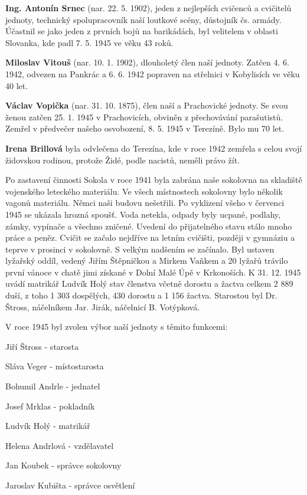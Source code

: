 \textbf{Ing. Antonín Srnec} (nar. 22. 5. 1902), jeden z nejlepších
cvičenců a cvičitelů jednoty, technický spolupracovník naší loutkové
scény, důstojník čs. armády. Účastnil se jako jeden z prvních bojů na
barikádách, byl velitelem v oblasti Slovanka, kde padl 7. 5. 1945 ve
věku 43 roků.

\textbf{Miloslav Vitouš} (nar. 10. 1. 1902), dlouholetý člen naší
jednoty. Zatčen 4. 6. 1942, odvezen na Pankrác a 6. 6. 1942 popraven na
střelnici v Kobylisích ve věku 40 let.

\textbf{Václav Vopička} (nar. 31. 10. 1875), člen naší a Prachovické
jednoty. Se svou ženou zatčen 25. 1. 1945 v Prachovicích, obviněn z
přechovávání parašutistů. Zemřel v předvečer našeho osvobození, 8. 5.
1945 v Terezíně. Bylo mu 70 let.

\textbf{Irena Brillová} byla odvlečena do Terezína, kde v roce 1942
zemřela s celou svojí židovskou rodinou, protože Židé, podle nacistů,
neměli právo žít.

Po zastavení činnosti Sokola v roce 1941 byla zabrána naše sokolovna na
skladiště vojenského leteckého materiálu. Ve všech místnostech sokolovny
bylo několik vagonů materiálu. Němci naši budovu nešetřili. Po vyklizení
všeho v červenci 1945 se ukázala hrozná spoušť. Voda netekla, odpady
byly ucpané, podlahy, zámky, vypínače a všechno zničené. Uvedení do
přijatelného stavu stálo mnoho práce a peněz. Cvičit se začalo nejdříve
na letním cvičišti, později v gymnáziu a teprve v prosinci v sokolovně.
S velkým nadšením se začínalo. Byl ustaven lyžařský oddíl, vedený Jiřím
Štěpničkou a Mirkem Vaňkem a 20 lyžařů trávilo první vánoce v chatě jimi
získané v Dolní Malé Úpě v Krkonoších. K 31. 12. 1945 uvádí matrikář
Ludvík Holý stav členstva včetně dorostu a žactva celkem 2 889 duší, z
toho 1 303 dospělých, 430 dorostu a 1 156 žactva. Starostou byl Dr.
Štross, náčelníkem Jar. Jirák, náčelnicí B. Votýpková.

V roce 1945 byl zvolen výbor naší jednoty s těmito funkcemi:

Jiří Štross - starosta

Sláva Veger - místostarosta

Bohumil Andrle - jednatel

Josef Mrklas - pokladník

Ludvík Holý - matrikář

Helena Andrlová - vzdělavatel

Jan Koubek - správce sokolovny

Jaroslav Kubišta - správce osvětlení


